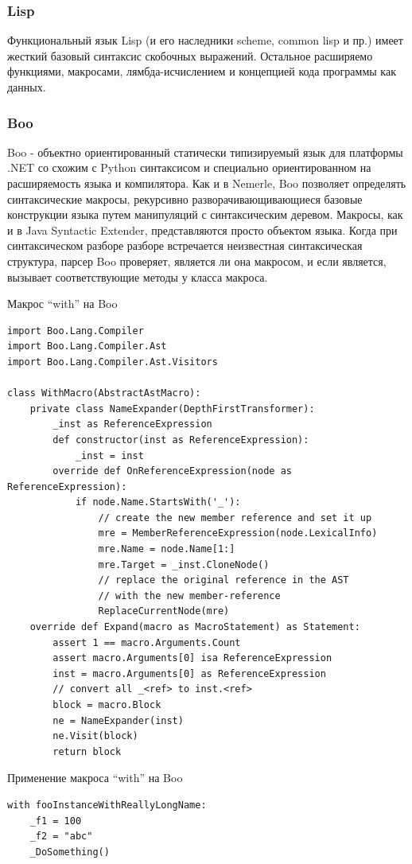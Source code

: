 \documentclass[a4paper,12pt]{article}
\begin{document}
\subsubsection{Lisp}
Функциональный язык Lisp (и его наследники scheme, common lisp и пр.) имеет
жесткий базовый синтаксис скобочных выражений. Остальное расширяемо функциями,
макросами, лямбда-исчислением и концепцией кода программы как данных.

\subsubsection{Boo}
Boo - объектно ориентированный статически типизируемый язык для платформы .NET
со схожим с Python синтаксисом и специально ориентированном на расширяемость
языка и компилятора. Как и в Nemerle, Boo позволяет определять синтаксические
макросы, рекурсивно разворачивающивающиеся базовые конструкции языка путем
манипуляций с синтаксическим деревом. Макросы, как и в Java Syntactic Extender,
представляются просто объектом языка. Когда при синтаксическом разборе разборе
встречается неизвестная синтаксическая структура, парсер Boo проверяет,
является ли она макросом, и если является, вызывает соответствующие методы у
класса макроса.

\begin{example}
Макрос ``with'' на Boo
\end{example}
\begin{verbatim}
import Boo.Lang.Compiler
import Boo.Lang.Compiler.Ast
import Boo.Lang.Compiler.Ast.Visitors

class WithMacro(AbstractAstMacro):
    private class NameExpander(DepthFirstTransformer):
        _inst as ReferenceExpression
        def constructor(inst as ReferenceExpression):
            _inst = inst
        override def OnReferenceExpression(node as ReferenceExpression):
            if node.Name.StartsWith('_'):
                // create the new member reference and set it up
                mre = MemberReferenceExpression(node.LexicalInfo)
                mre.Name = node.Name[1:]
                mre.Target = _inst.CloneNode()
                // replace the original reference in the AST
                // with the new member-reference
                ReplaceCurrentNode(mre)
    override def Expand(macro as MacroStatement) as Statement:
        assert 1 == macro.Arguments.Count
        assert macro.Arguments[0] isa ReferenceExpression
        inst = macro.Arguments[0] as ReferenceExpression
        // convert all _<ref> to inst.<ref>
        block = macro.Block
        ne = NameExpander(inst)
        ne.Visit(block)
        return block
\end{verbatim}
\begin{example}
Применение макроса ``with'' на Boo
\end{example}
\begin{verbatim}
with fooInstanceWithReallyLongName:
    _f1 = 100
    _f2 = "abc"
    _DoSomething()
\end{verbatim}
\end{document}
